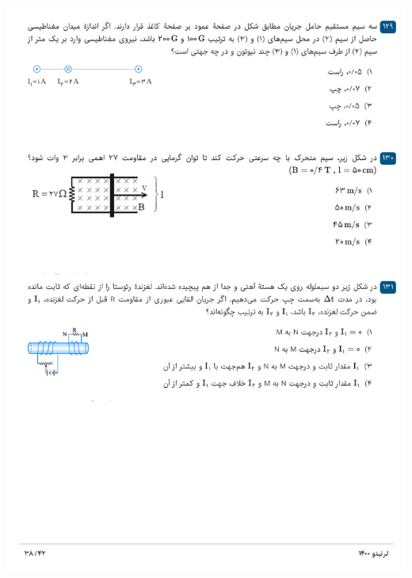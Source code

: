 \documentclass{book}
\begin{document}
\includegraphics[width=\textwidth]{"pages/38"}
\end{document}

